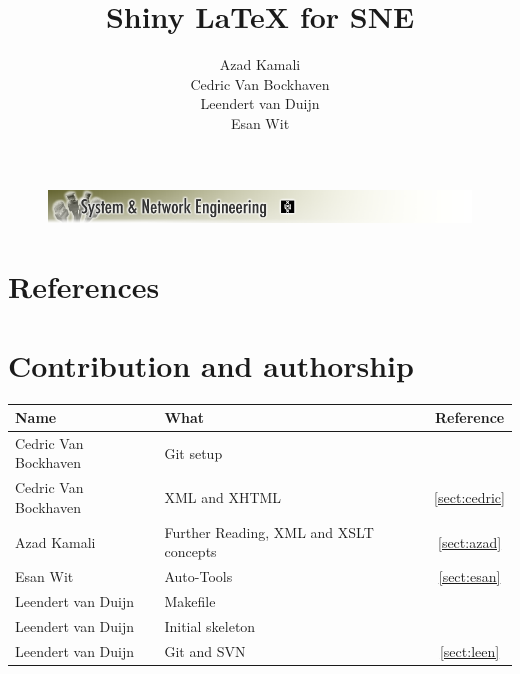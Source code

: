 \documentclass[a4paper,11pt] {article}
\title{Shiny \LaTeX{} for SNE\vspace{10pt}}
\author{
Azad Kamali\\
Cedric Van Bockhaven\\
Leendert van Duijn\\
Esan Wit\\
\vspace{10pt}
}
\begin{document}
\begin{titlepage}
	\enlargethispage{10cm}
	\begin{figure}[h]
	\includegraphics[width=1.0\textwidth]{images/SNELogo.png}
	\end{figure}
	{\let\newpage\relax\maketitle}
\end{titlepage}

\tableofcontents






\appendix
\section{References}



\section{Contribution and authorship}
\begin{tabular}{|l | l| c|}
\hline
Name& What&Reference\\
\hline

Cedric Van Bockhaven& Git setup&\\
Cedric Van Bockhaven&XML and XHTML&\ref{sect:cedric}\\
\hline
Azad Kamali& Further Reading, XML and XSLT concepts &\ref{sect:azad}\\
\hline
Esan Wit&Auto-Tools&\ref{sect:esan}\\
\hline
Leendert van Duijn& Makefile&\\
Leendert van Duijn& Initial skeleton&\\
Leendert van Duijn& Git and SVN&\ref{sect:leen}\\
\hline
\end{tabular}
\end{document}
